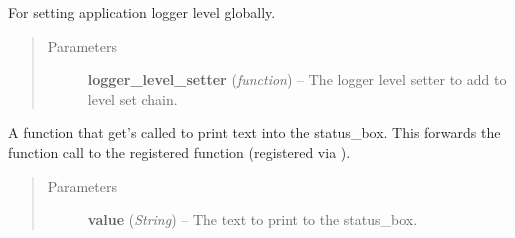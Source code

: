 \documentclass[letterpaper,10pt,english]{sphinxmanual}
\begin{document}

\begin{fulllineitems}
\label{diwavars:diwavars.add_logger_level_setter}
For setting application logger level globally.
\begin{quote}\begin{description}
\item[{Parameters}] \leavevmode
\textbf{logger\_level\_setter} (\emph{function}) -- The logger level setter to add to level set chain.

\end{description}\end{quote}

\end{fulllineitems}


\begin{fulllineitems}
\label{diwavars:diwavars.print_to_status_box}
A function that get's called to print text into the status\_box.
This forwards the function call to the registered function
(registered via {\hyperref[diwavars:diwavars.register_status_box_callback]{}}).
\begin{quote}\begin{description}
\item[{Parameters}] \leavevmode
\textbf{value} (\emph{String}) -- The text to print to the status\_box.

\end{description}\end{quote}

\end{fulllineitems}

\end{document}
